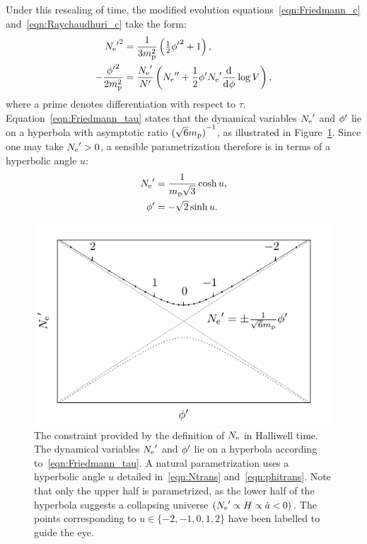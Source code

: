 Under this rescaling of time, the modified evolution equations~\eqref{eqn:Friedmann_c} and~\eqref{eqn:Raychaudhuri_c} take the form:
\begin{align}
  {{N_\mathrm{e}}^\prime}^2 
  &= 
  \frac{1}{3m_{\mathrm{p}}^2}\left({\textstyle\frac{1}{2}}{{\phi}^\prime}^2 + 1 \right),
  \label{eqn:Friedmann_tau} 
  \\
  -\frac{{{\phi}^\prime}^2}{2m_{\mathrm{p}}^2} 
  &= 
  \frac{{{N_\mathrm{e}}^\prime}}{{{N}^\prime}}\left({{N_\mathrm{e}}^{\prime\prime}} 
  +\frac{1}{2} {{\phi}^\prime}{{N_\mathrm{e}}^\prime} \frac{\operatorname{d}^{}\!{}}{\operatorname{d}^{}\!{\phi}}\log V \right),  
  \label{eqn:Raychaudhuri_tau}
\end{align}
where a prime denotes differentiation with respect to \(\tau\).  Equation~\eqref{eqn:Friedmann_tau} states that the dynamical variables \({{N_\mathrm{e}}^\prime}\) and \({{\phi}^\prime}\) lie on a hyperbola with asymptotic ratio \({(\sqrt{6}m_{\mathrm{p}})}^{-1}\), as illustrated in Figure~\ref{fig:figure_hyperbola}. Since one may take \({{N_\mathrm{e}}^\prime}>0\), a sensible parametrization therefore is in terms of a hyperbolic angle \(u\):
\begin{align}
  {{N_\mathrm{e}}^\prime} 
  &= 
  \frac{1}{m_{\mathrm{p}}\sqrt{3}}\cosh u,
  \label{eqn:Ntrans}
  \\
  {{\phi}^\prime} 
  &= 
  -\sqrt{2}\sinh u.
  \label{eqn:phitrans}
\end{align}
\begin{figure}[tp]
  \includegraphics[width=\textwidth]{chapters/kinetic_dominance/figures/hyperbola}
  \caption{The constraint provided by the definition of \(N_\mathrm{e}\) in Halliwell time. The dynamical variables \({{N_\mathrm{e}}^\prime}\) and \({{\phi}^\prime}\) lie on a hyperbola according to~\protect\eqref{eqn:Friedmann_tau}. A natural parametrization uses a hyperbolic angle \(u\) detailed in~\protect\eqref{eqn:Ntrans} and~\protect\eqref{eqn:phitrans}. Note that only the upper half is parametrized, as the lower half of the hyperbola suggests a collapsing universe \(({{N_\mathrm{e}}^\prime}\propto H\propto\dot{a}<0)\). The points corresponding to \(u\in\{-2,-1,0,1,2\}\) have been labelled to guide the eye.}\label{fig:figure_hyperbola}
\end{figure}
